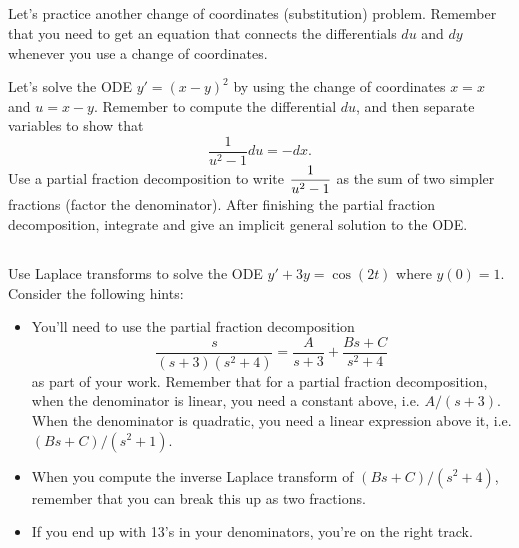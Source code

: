 \subsection*{\ideaD}
Let's practice another change of coordinates (substitution) problem.  Remember that you need to get an equation that connects the differentials $du$ and $dy$ whenever you use a change of coordinates. 
\begin{problem}
Let's solve the ODE $y'=(x-y)^2$ by using the change of coordinates $x=x$ and $u=x-y$. 
Remember to compute the differential $du$, and then separate variables to show that 
$$\frac{1}{u^2-1}du=-dx.$$
%
Use a partial fraction decomposition to write $\displaystyle\frac{1}{u^2-1}$ as the sum of two simpler fractions (factor the denominator). 
After finishing the partial fraction decomposition, integrate and give an implicit general solution to the ODE. 
\end{problem}





\subsection*{\ideaC}
\begin{problem}
Use Laplace transforms to solve the ODE $y'+3y=\cos(2t)$ where $y(0)=1$.  Consider the following hints:
\begin{itemize}
 \item 
{}%
You'll need to use the partial fraction decomposition 
$$\frac{s}{(s+3)(s^2+4)} = \frac{A}{s+3}+\frac{Bs+C}{s^2+4}$$ as part of your work.  Remember that for a partial fraction decomposition, when the denominator is linear, you need a constant above, i.e. $A/(s+3)$. When the denominator is quadratic, you need a linear expression above it, i.e.
$(Bs+C)/(s^2+1)$. 
\item 
When you compute the inverse Laplace transform of $(Bs+C)/(s^2+4)$, remember that you can break this up as two fractions. 
\item If you end up with 13's in your denominators, you're on the right track. 
\end{itemize}
\end{problem}

